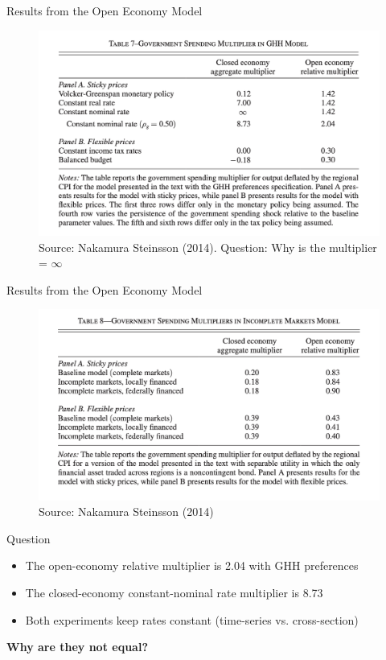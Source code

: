 \documentclass[english,xcolor=svgnames]{beamer}
\begin{document}
\begin{frame}{Results from the Open Economy Model}
\begin{figure}
\includegraphics[scale=0.5]{figures/ns_2}\\
Source: Nakamura Steinsson (2014). Question: Why is the multiplier  = $\infty$
\end{figure}
\end{frame}


\begin{frame}{Results from the Open Economy Model}
\begin{figure}
\includegraphics[scale=0.5]{figures/ns_3}\\
Source: Nakamura Steinsson (2014)
\end{figure}
\end{frame}

\begin{frame}{Question}
\begin{itemize}
\item The open-economy relative multiplier is 2.04 with GHH preferences
\item The closed-economy constant-nominal rate multiplier is 8.73
\item Both experiments keep rates constant (time-series vs. cross-section)
\end{itemize}
\begin{center}\textbf{Why are they not equal?} \end{center}
\end{frame}
\end{document}
